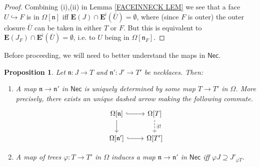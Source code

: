 \documentclass[a4paper,10pt]{article}%
\numberwithin{equation}{section}
\numberwithin{figure}{section}
\newtheorem{proposition}[equation]{Proposition}%
\theoremstyle{definition} %
\newcommand{\1}{\ensuremath{\mathbbm 1}}%
\begin{document}
\begin{proof}
	Combining (i),(ii) in 
	Lemma \ref{FACEINNECK LEM}
	we see that a face $U \hookrightarrow F$ is
	in $\Omega[\mathfrak{n}]$
	iff $\boldsymbol{E}(J) \cap 
	\boldsymbol{E}^{\mathsf{i}}(\bar{U}) = \emptyset$,
	where (since $F$ is outer) the outer closure $\bar{U}$
	can be taken in either $T$ or $F$.
	But this is equivalent to 
	$\boldsymbol{E}(J_F) \cap 
	\boldsymbol{E}^{\mathsf{i}}(\bar{U}) = \emptyset$,
	i.e. to $U$ being in $\Omega[\mathfrak{n}_F]$.
\end{proof}



Before proceeding, we will need to better understand the maps in 
$\mathsf{Nec}$.





\begin{proposition}\label{MAPNECK PROP}
	Let $\mathfrak{n}\colon J \to T$ and $\mathfrak{n}' \colon J' \to T'$ be necklaces. Then:
\begin{enumerate}
\item[(i)]
	A map $\mathfrak{n} \to \mathfrak{n}'$ in $\mathsf{Nec}$
	is uniquely determined by some map 
	$T \to T'$ in $\Omega$. 
	More precisely, there exists an unique dashed arrow
	making the following commute.
\begin{equation}\label{NECKMAP EQ}
\begin{tikzcd}
	\Omega[\mathfrak{n}] 
	\ar[hookrightarrow]{r} 
	\ar{d}
&
	\Omega[T] 
	\ar[dashed]{d}{\exists !}
\\
	\Omega[\mathfrak{n}']
	\ar[hookrightarrow]{r}
&
	\Omega[T']
	\end{tikzcd}
\end{equation}
\item[(ii)]
	A map of trees 
	$\varphi \colon T \to T'$ in $\Omega$
	induces a map 
	$\mathfrak{n} \to \mathfrak{n}'$ in $\mathsf{Nec}$
	iff
	$\varphi J \supseteq J'_{\overline{\varphi T}}$.
\end{enumerate}
\end{proposition}
\end{document}
